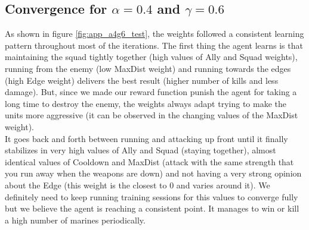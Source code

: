 


\subsection*{Convergence for $\alpha= 0.4$ and $\gamma = 0.6$}

As shown in figure \ref{fig:app_a4g6_test}, the weights followed a consistent learning pattern throughout most of the iterations. The first thing the agent learns is that maintaining the squad tightly together (high values of Ally and Squad weights), running from the enemy (low MaxDist weight) and running towards the edges (high Edge weight) delivers the best result (higher number of kills and less damage). But, since we made our reward function punish the agent for taking a long time to destroy the enemy, the weights always adapt trying to make the units more aggressive (it can be observed in the changing values of the MaxDist weight).\\

It goes back and forth between running and attacking up front until it finally stabilizes in very high values of Ally and Squad (staying together), almost identical values of Cooldown and MaxDist (attack with the same strength that you run away when the weapons are down) and not having a very strong opinion about the Edge (this weight is the closest to 0 and varies around it). We definitely need to keep running training sessions for this values to converge fully but we believe the agent is reaching a consistent point. It manages to win or kill a high number of marines periodically. 